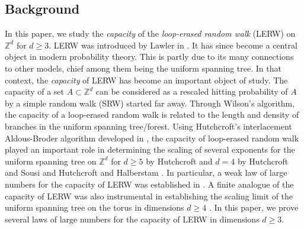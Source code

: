 \documentclass{article}
\newcommand{\Z}{\mathbb{Z}}
\newcommand{\1}{\mathbf{1}}
\theoremstyle{definition}
\numberwithin{equation}{section}
\numberwithin{theorem}{section}
\begin{document}
\subsection{Background}\label{sec:background}
In this paper, we study the \emph{capacity} of the \emph{loop-erased random walk} (LERW) on $\Z^d$ for $d\geq3$. LERW was introduced by Lawler in \cite{lawler80selfavoiding}. It has since become a central object in modern probability theory. This is partly due to its many connections to other models, chief among them being the uniform spanning tree. In that context, the \emph{capacity} of LERW has become an important object of study. The capacity of a set $A\subset\Z^d$ can be considered as a rescaled hitting probability of $A$ by a simple random walk (SRW) started far away. Through Wilson's algorithm, the capacity of a loop-erased random walk is related to the length and density of branches in the uniform spanning tree/forest. Using Hutchcroft's interlacement Aldous-Broder algorithm developed in \cite{hutchcroft2020universality}, the capacity of loop-erased random walk played an important role in determining the scaling of several exponents for the uniform spanning tree on $\Z^d$ for $d\geq5$ by Hutchcroft \cite{hutchcroft2020universality} and $d=4$ by Hutchcroft and Sousi \cite{hutchcroft2020logarithmic} and Hutchcroft and Halberstam \cite{halberstam22logarithmic}. In particular, a weak law of large numbers for the capacity of LERW was established in \cite{hutchcroft2020logarithmic}. A finite analogue of the capacity of LERW was also instrumental in establishing the scaling limit of the uniform spanning tree on the torus in dimensions $d\geq4$ \cite{archer24ghp, archer24dense, michaeli2021diameter, peres04scaling, schweinsberg2009loop}. In this paper, we prove several laws of large numbers for the capacity of LERW in dimensions $d\geq3$.
\end{document}
